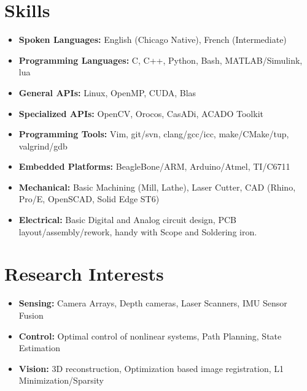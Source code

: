 \documentclass[line,lm,rm,11pt]{res} %
\def\spaceline{\vspace{1mm} \fullline}
\begin{document}
\begin{resume}
\section{Skills}
	\begin{itemize}
	\item 
	\spaceline
{\bf Spoken Languages: } English (Chicago Native), French (Intermediate)
\item {\bf Programming Languages: } C, C++, Python, Bash, MATLAB/Simulink, lua
\item {\bf General APIs: } Linux, OpenMP, CUDA, Blas
\item {\bf Specialized APIs: } OpenCV, Orocos, CasADi, ACADO Toolkit
\item {\bf Programming Tools: } Vim, git/svn, clang/gcc/icc, make/CMake/tup, valgrind/gdb
\item {\bf Embedded Platforms: } BeagleBone/ARM, Arduino/Atmel, TI/C6711
\item {\bf Mechanical: } Basic Machining (Mill, Lathe), Laser Cutter, CAD (Rhino, Pro/E, OpenSCAD, Solid Edge ST6)
\item {\bf Electrical: } Basic Digital and Analog circuit design, PCB layout/assembly/rework, handy with Scope and Soldering iron.
\end{itemize}

\section{Research Interests}
\begin{itemize}
\item 
	\spaceline
	{\bf Sensing:} Camera Arrays, Depth cameras, Laser Scanners, IMU Sensor Fusion
\item 
	{\bf Control:} Optimal control of nonlinear systems, Path Planning, State Estimation
\item 
	{\bf Vision:} 3D reconstruction, Optimization based image registration, L1 Minimization/Sparsity
\end{itemize}


\end{resume}
\end{document}
